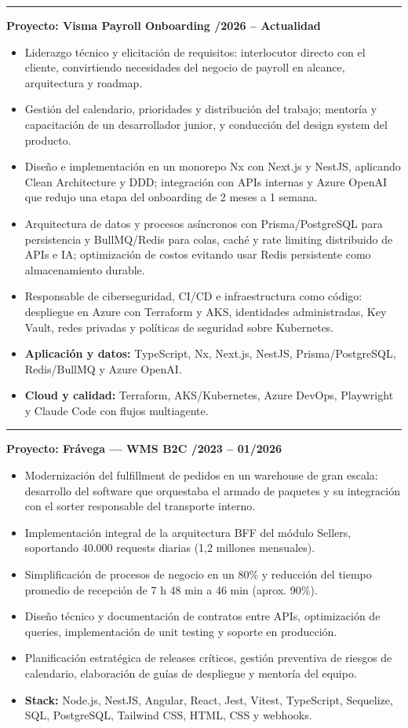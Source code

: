 \documentclass[11pt,letterpaper]{article}
\newcommand{\project}[1]{%
  \Needspace{6\baselineskip}%
  \vspace{0.3em}%
  {\color{accent}\rule[0.18em]{0.45em}{0.45em}}\hspace{0.4em}%
  \textbf{\color{accentdark}Proyecto: #1}\par
}
\begin{document}
\newpage
\project{Visma Payroll Onboarding \textnormal{\small\textcolor{muted}{\enspace 01/2026 -- Actualidad}}}
\begin{itemize}
  \item Liderazgo técnico y elicitación de requisitos: interlocutor directo con el cliente,
    convirtiendo necesidades del negocio de payroll en alcance, arquitectura y roadmap.
  \item Gestión del calendario, prioridades y distribución del trabajo; mentoría y
    capacitación de un desarrollador junior, y conducción del design system del producto.
  \item Diseño e implementación en un monorepo Nx con Next.js y NestJS, aplicando Clean
    Architecture y DDD; integración con APIs internas y Azure OpenAI que redujo una etapa
    del onboarding de 2 meses a 1 semana.
  \item Arquitectura de datos y procesos asíncronos con Prisma/PostgreSQL para persistencia
    y BullMQ/Redis para colas, caché y rate limiting distribuido de APIs e IA; optimización
    de costos evitando usar Redis persistente como almacenamiento durable.
  \item Responsable de ciberseguridad, CI/CD e infraestructura como código: despliegue en
    Azure con Terraform y AKS, identidades administradas, Key Vault, redes privadas y
    políticas de seguridad sobre Kubernetes.
  \item \textbf{Aplicación y datos:} TypeScript, Nx, Next.js, NestJS,
    Prisma/PostgreSQL, Redis/BullMQ y Azure OpenAI.
  \item \textbf{Cloud y calidad:} Terraform, AKS/Kubernetes, Azure DevOps, Playwright y
    Claude Code con flujos multiagente.
\end{itemize}

\project{Frávega --- WMS B2C \textnormal{\small\textcolor{muted}{\enspace 06/2023 -- 01/2026}}}
\begin{itemize}
  \item Modernización del fulfillment de pedidos en un warehouse de gran escala:
    desarrollo del software que orquestaba el armado de paquetes y su integración con el
    sorter responsable del transporte interno.
  \item Implementación integral de la arquitectura BFF del módulo Sellers, soportando
    40.000 requests diarias (1,2 millones mensuales).
  \item Simplificación de procesos de negocio en un 80\% y reducción del tiempo promedio
    de recepción de 7 h 48 min a 46 min (aprox. 90\%).
  \item Diseño técnico y documentación de contratos entre APIs, optimización de queries,
    implementación de unit testing y soporte en producción.
  \item Planificación estratégica de releases críticos, gestión preventiva de riesgos de
    calendario, elaboración de guías de despliegue y mentoría del equipo.
  \item \textbf{Stack:} Node.js, NestJS, Angular, React, Jest, Vitest, TypeScript,
    Sequelize, SQL, PostgreSQL, Tailwind CSS, HTML, CSS y webhooks.
\end{itemize}
\end{document}
